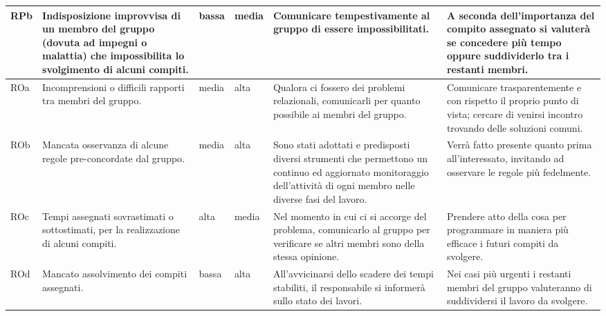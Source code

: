{\begin{longtable}{|p{1cm}|p{3cm}|p{1cm}|p{1cm}|p{3cm}|p{3cm}|}
        \hline
        RPb &
        Indisposizione improvvisa di un membro del gruppo (dovuta ad impegni o malattia) che impossibilita lo svolgimento di alcuni compiti. &
        bassa &
        media &
        Comunicare tempestivamente al gruppo di essere impossibilitati. &
        A seconda dell'importanza del compito assegnato si valuterà se concedere più tempo oppure suddividerlo tra i restanti membri. \\
        \hline
        ROa &
        Incomprensioni o difficili rapporti tra membri del gruppo. &
        media &
        alta &
        Qualora ci fossero dei problemi relazionali, comunicarli per quanto possibile ai membri del gruppo. &
        Comunicare trasparentemente e con rispetto il proprio punto di vista; cercare di venirsi incontro trovando delle soluzioni comuni. \\
        \hline
        ROb &
        Mancata osservanza di alcune regole pre-concordate dal gruppo. &
        media &
        alta &
        Sono stati adottati e predisposti diversi strumenti che permettono un continuo ed aggiornato monitoraggio dell'attività di ogni membro nelle diverse fasi del lavoro. &
        Verrà fatto presente quanto prima all'interessato, invitando ad osservare le regole più fedelmente. \\
        \hline
        ROc &
        Tempi assegnati sovrastimati o sottostimati, per la realizzazione di alcuni compiti. &
        alta &
        media &
        Nel momento in cui ci si accorge del problema, comunicarlo al gruppo per verificare se altri membri sono della stessa opinione. &
        Prendere atto della cosa per programmare in maniera più efficace i futuri compiti da svolgere. \\
        \hline
        ROd &
        Mancato assolvimento dei compiti assegnati. &
        bassa &
        alta &
        All'avvicinarsi dello scadere dei tempi stabiliti, il responsabile si informerà sullo stato dei lavori. &
        Nei casi più urgenti i restanti membri del gruppo valuteranno di suddividersi il lavoro da svolgere. \\
        \hline
    
    \end{longtable}
    }
        
